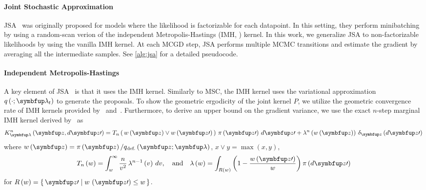 


\vspace{-0.05in}
\paragraph{Joint Stochastic Approximation}
JSA~\citep{pmlr-v124-ou20a} was originally proposed for models where the likelihood is factorizable for each datapoint.
In this setting, they perform minibatching by using a random-scan verion of the independent Metropolis-Hastings (IMH, \citealt{hastings_monte_1970,robert_monte_2004}) kernel.
In this work, we generalize JSA to non-factorizable likelihoods by using the vanilla IMH kernel.
At each MCGD step, JSA performs multiple MCMC transitions and estimate the gradient by averaging all the intermediate samples.
See \cref{alg:jsa} for a detailed pseudocode.

\vspace{-0.05in}
\paragraph{Independent Metropolis-Hastings}
A key element of JSA~\citep{pmlr-v124-ou20a} is that it uses the IMH kernel.
Similarly to MSC, the IMH kernel uses the variational approximation \(q\left(\cdot; \vlambda_t\right)\) to generate the proposals.
To show the geometric ergodicity of the joint kernel \(P\), we utilize the geometric convergence rate of IMH kernels provided by~\citet[Theorem 2.1]{10.2307/2242610} and~\citet{wang_exact_2020}.
Furthermore, to derive an upper bound on the gradient variance, we use the exact \(n\)-step marginal IMH kernel derived by~\citet{Smith96exacttransition} as
{%
  \begin{align}
  K^n_{\vlambda}\left(\vz, d\vz\prime\right) 
  = T_n\left(\, w\left(\vz\right) \vee w\left(\vz\prime\right)\,\right) \, \pi\left(\vz\prime\right) \, d\vz\prime
  + \lambda^n\left(w\left(\vz\right)\right) \, \delta_{\vz}\left(d\vz\prime\right)
  \label{eq:imh_exact_kernel}
  \end{align}
}%
where {\(w\left(\vz\right) = \pi\left(\vz\right)/q_{\text{def.}}\left(\vz; \vlambda\right)\), \(x \vee y = \max\left(x, y\right)\)},
{%
  \begin{align}
    T_n\left(w\right)      = \int_w^{\infty} \frac{n}{v^2} \, \lambda^{n-1}\left(v\right)\,dv,
    \quad\text{and}\quad
    \lambda\left(w\right) = \int_{R\left(w\right)} \left( 1 - \frac{w\left(\vz\prime\right)}{w}  \right) \pi\left(d\vz\prime\right)\label{eq:T_lambda}
  \end{align}
}
for {\(R\left(w\right) = \{\, \vz\prime \mid w\,\left(\vz\prime\right) \leq w \,\}\)}.
%


%


